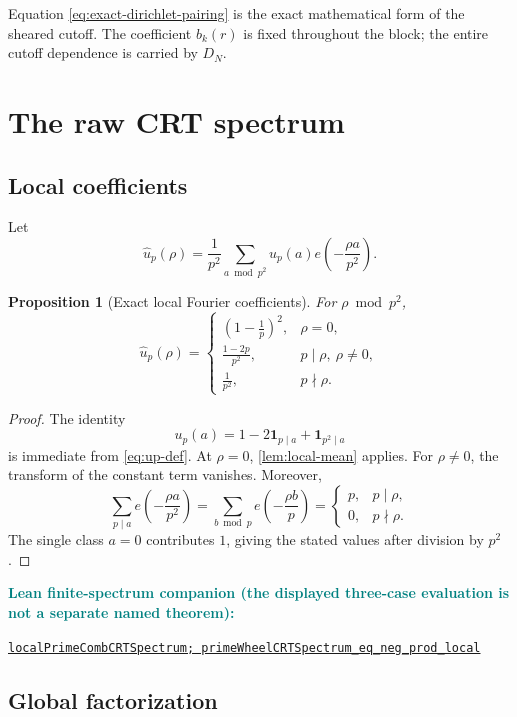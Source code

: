 \documentclass[11pt]{article}
\newtheorem{proposition}[theorem]{Proposition}
\theoremstyle{definition}
\newcommand{\one}{\mathbf 1}
\newcommand{\leanxref}[3]{%
  \par\smallskip
  {\small\noindent\textcolor{teal}{\textbf{#1:}}\par
  \noindent\href{#3}{\nolinkurl{#2}}\par}
  \smallskip
}
\begin{document}
Equation \eqref{eq:exact-dirichlet-pairing} is the exact mathematical form of the sheared cutoff.  The coefficient $b_k(r)$ is fixed throughout the block; the entire cutoff dependence is carried by $D_N$.

\section{The raw CRT spectrum}

\subsection{Local coefficients}

Let
\[
\widehat u_p(\rho)=\frac1{p^2}\sum_{a\bmod p^2}u_p(a)e\!\left(-\frac{\rho a}{p^2}\right).
\]

\begin{proposition}[Exact local Fourier coefficients]\label{prop:local-fourier}
For $\rho\bmod p^2$,
\[
\widehat u_p(\rho)=
\begin{cases}
\displaystyle\left(1-\frac1p\right)^2,&\rho=0,\\[7pt]
\displaystyle\frac{1-2p}{p^2},&p\mid\rho,\ \rho\ne0,\\[7pt]
\displaystyle\frac1{p^2},&p\nmid\rho.
\end{cases}
\]
\end{proposition}

\begin{proof}
The identity
\[
u_p(a)=1-2\one_{p\mid a}+\one_{p^2\mid a}
\]
is immediate from \eqref{eq:up-def}.  At $\rho=0$, \cref{lem:local-mean} applies.  For $\rho\ne0$, the transform of the constant term vanishes.  Moreover,
\[
\sum_{p\mid a}e\!\left(-\frac{\rho a}{p^2}\right)
=\sum_{b\bmod p}e\!\left(-\frac{\rho b}{p}\right)
=\begin{cases}p,&p\mid\rho,\\0,&p\nmid\rho.
\end{cases}
\]
The single class $a=0$ contributes $1$, giving the stated values after division by $p^2$.
\end{proof}
\leanxref{Lean finite-spectrum companion (the displayed three-case evaluation is not a separate named theorem)}{localPrimeCombCRTSpectrum; primeWheelCRTSpectrum_eq_neg_prod_local}{https://github.com/OVVO-Financial/prime-wheel-mobius/blob/main/formalization/RHLean/Analysis/PrimeWheelCompleteSpectrum.lean}

\subsection{Global factorization}
\end{document}
